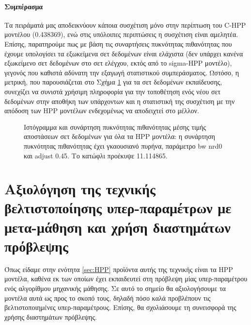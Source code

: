 \paragraph{Συμπέρασμα} Τα πειράματά μας αποδεικνύουν κάποια συσχέτιση μόνο στην περίπτωση του C-HPP μοντέλου (0.438369), ενώ στις υπόλοιπες περιπτώσεις η συσχέτιση είναι αμελητέα. Επίσης, παρατηρούμε πως με βάση τις συναρτήσεις πυκνότητας πιθανότητας που έχουμε υπολογίσει τα εξωκείμενα σετ δεδομένων είναι ελάχιστα (δεν υπάρχει κανένα εξωκείμενο σετ δεδομένων στο σετ ελέγχου, εκτός από το sigma-HPP μοντέλο), γεγονός που καθιστά αδύνατη την εξαγωγή στατιστικού συμπεράσματος. Ωστόσο, η μετρική, που παρουσιάζεται στο Σχήμα \ref{fig:histtotal} για τα σετ δεδομένων εκπαίδευσης, συνεχίζει να συνιστά χρήσιμη πληροφορία για την τοποθέτηση ενός νέου σετ δεδομένων στην αποθήκη των υπάρχοντων και η στατιστική της συσχέτιση με την απόδοση των HPP μοντέλων ενδεχομένως να αποδειχτεί στο μέλλον.

\begin{figure}[htbp]
	\scalebox{0.7}{
		}
	\caption[Ιστόγραμμα και συνάρτηση πυκνότητας πιθανότητας μέσης τιμής αποστάσεων σετ δεδομένων για όλα τα HPP μοντέλα]{Ιστόγραμμα και συνάρτηση πυκνότητας πιθανότητας μέσης τιμής αποστάσεων σετ δεδομένων για όλα τα HPP μοντέλα: η συνάρτηση πυκνότητας πιθανότητας έχει γκαουσιανό πυρήνα, παράμετρο bw nrd0 και adjust 0.45. Το κατώφλι προέκυψε 11.114865.}
	\label{fig:histtotal}
\end{figure}

\section{Αξιολόγηση της τεχνικής βελτιστοποίησης υπερ-παραμέτρων με μετα-μάθηση και χρήση διαστημάτων πρόβλεψης}\label{section:hppexp}
Όπως είδαμε στην ενότητα \ref{sec:HPP} προϊόντα αυτής της τεχνικής είναι τα \gls{HPP} μοντέλα, καθένα εκ των οποίων έχει εκπαιδευτεί στη πρόβλεψη μίας υπερ-παραμέτρου ενός αλγορίθμου μηχανικής μάθησης. Σε αυτό το σημείο θα αξιολογήσουμε τα μοντέλα αυτά ως προς το σκοπό τους, δηλαδή πόσο καλά προβλέπουν τις βελτιστοποιημένες υπερ-παραμέτρους. Επίσης, θα σχολιάσουμε τη συνεισφορά της χρήσης διαστημάτων πρόβλεψης.

